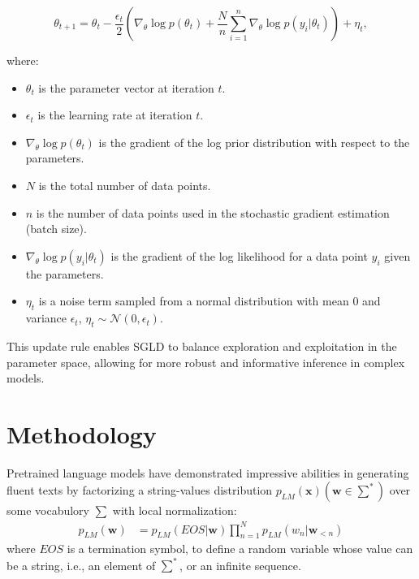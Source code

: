 \documentclass{article}
\begin{document}
\[ \theta_{t+1} = \theta_t - \frac{\epsilon_t}{2} \left( \nabla_\theta \log p(\theta_t) + \frac{N}{n} \sum_{i=1}^n \nabla_\theta \log p(y_{i}|\theta_t) \right) + \eta_t, \]

where:
\begin{itemize}
    \item \( \theta_t \) is the parameter vector at iteration \( t \).
    \item \( \epsilon_t \) is the learning rate at iteration \( t \).
    \item \( \nabla_\theta \log p(\theta_t) \) is the gradient of the log prior distribution with respect to the parameters.
    \item \( N \) is the total number of data points.
    \item \( n \) is the number of data points used in the stochastic gradient estimation (batch size).
    \item \( \nabla_\theta \log p(y_i|\theta_t) \) is the gradient of the log likelihood for a data point \( y_i \) given the parameters.
    \item \( \eta_t \) is a noise term sampled from a normal distribution with mean 0 and variance \( \epsilon_t \), \( \eta_t \sim \mathcal{N}(0, \epsilon_t) \).
\end{itemize}

This update rule enables SGLD to balance exploration and exploitation in the parameter space, allowing for more robust and informative inference in complex models.

\section{Methodology} \cite[]{du2023principled}
Pretrained language models have demonstrated impressive abilities in generating fluent texts by factorizing a string-values distribution $p_{LM}(\boldsymbol{x}) (\boldsymbol{w} \in \sum^*)$ over some vocabulory $\sum$ with local normalization:
\begin{align}
    p_{LM}(\boldsymbol{w}) & = p_{LM}(EOS | \boldsymbol{w}) \prod_{n=1}^{N} p_{LM}(w_n | \boldsymbol{w}_{<n}) \label{eq:1}
\end{align}
where $EOS$ is a termination symbol, to define a
random variable whose value can be a string, i.e.,
an element of $\sum^*$, or an infinite sequence.
\end{document}
